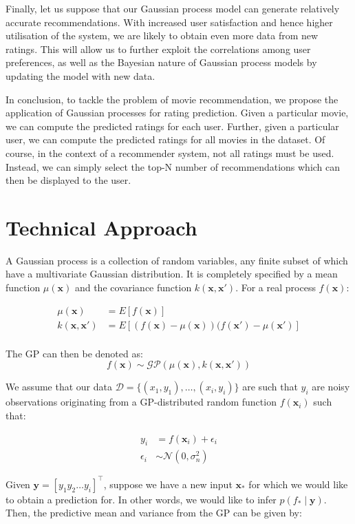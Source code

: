 \documentclass[letterpaper]{article}
\begin{document}
Finally, let us suppose that our Gaussian process model can generate relatively accurate recommendations. With increased user satisfaction and hence higher utilisation of the system, we are likely to obtain even more data from new ratings. This will allow us to further exploit the correlations among user preferences, as well as the Bayesian nature of Gaussian process models by updating the model with new data.

In conclusion, to tackle the problem of movie recommendation, we propose the application of Gaussian processes for rating prediction.
Given a particular movie, we can compute the predicted ratings for each user.
Further, given a particular user, we can compute the predicted ratings for all movies in the dataset.
Of course, in the context of a recommender system, not all ratings must be used. 
Instead, we can simply select the top-N number of recommendations which can then be displayed to the user.

\section{Technical Approach}
A Gaussian process is a collection of random variables, any finite subset of which have a multivariate Gaussian distribution. It is completely specified by a mean function $\mu(\textbf{x})$ and the covariance function $k(\textbf{x}, \textbf{x}')$. For a real process $f(\textbf{x})$:

\begin{align*}
	\mu(\textbf{x}) &= E[f(\textbf{x})] \\
	k(\textbf{x}, \textbf{x}') &= E[(f(\textbf{x}) - \mu(\textbf{x}))(f(\textbf{x}') - \mu(\textbf{x}')] \\
\end{align*}

The GP can then be denoted as:
\[f(\textbf{x}) \sim \mathcal{GP}(\mu(\textbf{x}), k(\textbf{x}, \textbf{x}'))\]

We assume that our data $\mathcal{D} = \{(x_1, y_1), \ldots, (x_i, y_i)\}$ are such that $y_i$ are noisy observations originating from a GP-distributed random function $f(\textbf{x}_i)$ such that:

\begin{align*}
	y_i &= f(\textbf{x}_i) + \epsilon_i \\
	\epsilon_i &\sim \mathcal{N}(0, \sigma_n^2)
\end{align*}

Given $\textbf{y} = [y_1y_2\ldots y_i]^\top$, suppose we have a new input $\textbf{x}_*$ for which we would like to obtain a prediction for. In other words, we would like to infer $p(f_* \mid \textbf{y})$. Then, the predictive mean and variance from the GP can be given by:
\end{document}
